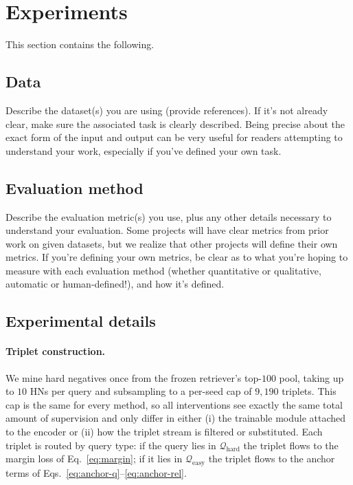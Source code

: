 \section{Experiments}
This section contains the following.

\subsection{Data}
Describe the dataset(s) you are using (provide references). If it's not already clear, make sure the associated task is clearly described.
Being precise about the exact form of the input and output can be very useful for readers attempting to understand your work, especially if you've defined your own task.

\subsection{Evaluation method}
Describe the evaluation metric(s) you use, plus any other details necessary to understand your evaluation.
Some projects will have clear metrics from prior work on given datasets, but we realize that other projects will define their own metrics.
If you're defining your own metrics, be clear as to what you're hoping to measure with each evaluation method (whether quantitative or qualitative, automatic or human-defined!), and how it's defined.

\subsection{Experimental details}
\label{sec:expdetails}

\paragraph{Triplet construction.}
We mine hard negatives once from the frozen retriever's top-$100$ pool, taking up to $10$ HNs per query and subsampling to a per-seed cap of $9{,}190$ triplets. This cap is the same for every method, so all interventions see exactly the same total amount of supervision and only differ in either (i) the trainable module attached to the encoder or (ii) how the triplet stream is filtered or substituted. Each triplet is routed by query type: if the query lies in $\mathcal{Q}_{\text{hard}}$ the triplet flows to the margin loss of Eq.~\eqref{eq:margin}; if it lies in $\mathcal{Q}_{\text{easy}}$ the triplet flows to the anchor terms of Eqs.~\eqref{eq:anchor-q}--\eqref{eq:anchor-rel}.

